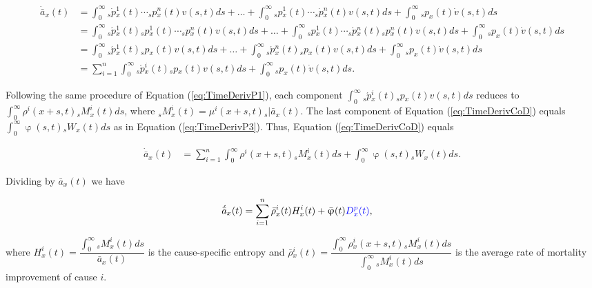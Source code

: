 \documentclass[12pt]{article}
\newcommand{\revision}[1]{\textcolor{blue}{#1}}
\begin{document}
\begin{equation}\label{eq:TimeDerivCoD}
\begin{split}
\dot{\bar{a}} _x(t) &= \int_0^\infty   {_s}\dot{p}{^1_x}(t) \cdots{_s}p{^n_x}(t) v(s,t)ds +\dots+\int_0^\infty   {_s}{p}{^1_x}(t) \cdots{_s}\dot{p}{^n_x}(t) v(s,t)ds +
\int_0^\infty {}_sp_x(t) \dot{v}(s,t)ds\\
&= \int_0^\infty  {_s}\acute{p}{^1_x}(t)  {_s}{p}{^1_x}(t) \cdots{_s}p{^n_x}(t) v(s,t)ds +\dots+\int_0^\infty   {_s}{p}{^1_x}(t) \cdots{_s}\acute{p}{^n_x}(t){_s}{p}{^n_x}(t) v(s,t)ds +\int_0^\infty {}_sp_x(t) \dot{v}(s,t)ds\\
&= \int_0^\infty  {_s}\acute{p}{^1_x}(t)  {_s}{p}{_x}(t)v(s,t)ds +\dots+\int_0^\infty   {}_s\acute{p}{^n_x}(t) {_s}{p}{_x}(t) v(s,t)ds +\int_0^\infty {}_sp_x(t) \dot{v}(s,t)ds\\
&= \sum_{i=1}^{n} \int_0^\infty  {_s}\acute{p}{^i_x}(t)  {_s}{p}{_x}(t)v(s,t)ds +\int_0^\infty {}_sp_x(t) \dot{v}(s,t)ds.
\end{split}
\end{equation}


Following the same procedure of Equation (\ref{eq:TimeDerivP1}), each component $\int_0^\infty  {_s}\acute{p}{^i_x}(t)  {_s}{p}{_x}(t)v(s,t)ds$ reduces to $\int_0^\infty  \rho^{i}(x+s,t){}_sM^{i}_x(t)ds$, where ${}_sM^{i}_x(t)= \mu^{i}(x+s,t){}_s|\bar{a}_x(t)$.  The last component of Equation (\ref{eq:TimeDerivCoD}) equals $\int_0^\infty  \upvarphi(s,t) {}_sW_x(t) ds$ as in Equation (\ref{eq:TimeDerivP3}). Thus, Equation (\ref{eq:TimeDerivCoD}) equals


\begin{equation}\label{eq:TimeDerivCoD2}
\begin{split}
\dot{\bar{a}} _x(t) &= \sum_{i=1}^{n} \int_0^\infty  \rho^{i}(x+s,t){}_sM^{i}_x(t)ds +\int_0^\infty  \upvarphi(s,t) {}_sW_x(t) ds.
\end{split}
\end{equation}

Dividing by $\bar{a} _x(t)$ we have


\begin{equation}\label{eq:TimeDerivCoD3}
\begin{split}
\acute{\bar{a}} _x(t) &= \sum_{i=1}^{n} \bar{\rho}{^i_x}(t){H}^{i}_x(t)+\bar{\upvarphi}(t)\revision{{D}{^p_x}(t)},
\end{split}
\end{equation}


where ${H}^{i}_x(t)=\dfrac{\int_{0}^{\infty}{}_sM^{i}_x(t)ds}{\bar{a} _x(t)}$ is the cause-specific entropy and $\bar{\rho}{^i_x}(t)=\dfrac{\int_{0}^{\infty}\rho{_x^i}(x+s,t) {}_sM^{i}_x(t)ds}{\int_{0}^{\infty}{}_sM^{i}_x(t)ds}$ is the average rate of mortality improvement of cause $i$.
\end{document}
